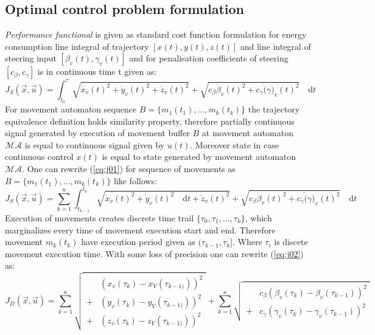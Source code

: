 \subsection{Optimal control problem formulation}
\noindent\textit{Performance functional} is given as standard cost function formulation for energy consumption line integral of trajectory $[x(t),y(t),z(t)]$ and line integral of steering input $[\beta_v(t),\gamma_v(t)]$  and for penalisation coefficients of steering $[c_\beta,c_\gamma]$ is in continuous time t given as: 
\begin{equation}\label{eq:j01}
    J_S(\vec{x},\vec{u})= \int_{t_0}^{\tau} \sqrt{\dot{x}_v(t)^2 + \dot{y}_v(t)^2 + \dot{z}_v(t)^2} + \sqrt{c_\beta\dot{\beta}_v(t)^2+c_\gamma\dot(\gamma)_v(t)^2} \quad \text{d}t
\end{equation}
For movement automaton sequence $B=\{m_1(t_1),\dots,m_k(t_k)\}$ the trajectory equivalence definition holds similarity property, therefore partially continuous signal generated by execution of movement buffer $B$ at movement automaton $\mathscr{MA}$ is equal to continuous signal given by $u(t)$. Moreover state in case continuous control $x(t)$ is equal to state generated by movement automaton $\mathscr{MA}$. One can rewrite (\ref{eq:j01}) for sequence of movements as $B=\{m_1(t_1),\dots,m_k(t_k)\}$ like follows:
\begin{equation}\label{eq:j02}
    J_S(\vec{x},\vec{u})= \sum_{k=1}^n \int_{t_{k-1}}^{t_{k}} \sqrt{\dot{x}_v(t)^2 + \dot{y}_v(t)^2 \quad \text{d}t + \dot{z}_v(t)^2} + \sqrt{c_\beta\dot{\beta}_v(t)^2+c_\gamma\dot(\gamma)_v(t)^2} \quad \text{d}t
\end{equation}
Execution of movements creates discrete time trail $\{\tau_0,\tau_1,\dots,\tau_k\}$, which marginalizes every time of movement execution start and end. Therefore movement $m_k(t_k)$ have execution period given as $(\tau_{k-1},\tau_k]$. Where $\tau_i$ is discete movement execution time. With some loss of precision one can rewrite (\ref{eq:j02}) as:
\begin{equation}\label{eq:j03}
    J_D(\vec{x},\vec{u}) = \sum_{k=1}^n \sqrt{\begin{aligned}
        &\left(x_v(\tau_{k})-x_V(\tau_{k-1)})\right)^2\\
        +&\left(y_v(\tau_{k})-y_V(\tau_{k-1)})\right)^2\\
        +&\left(z_v(\tau_{k})-z_V(\tau_{k-1)})\right)^2
    \end{aligned}}
    + \sum_{k=1}^n \sqrt{
    \begin{aligned}
        &c_\beta\left(\beta_v(\tau_{k})-\beta_v(\tau_{k-1})\right)^2\\
        +&c_\gamma\left(\gamma_v(\tau_{k})-\gamma_v(\tau_{k-1})\right)^2
    \end{aligned}}
\end{equation}
